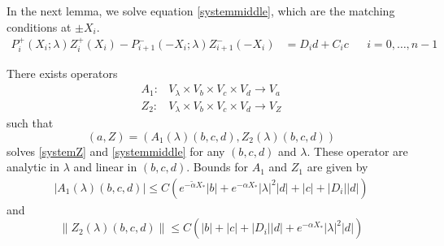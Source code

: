 \documentclass[thesis.tex]{subfiles}
\begin{document}
In the next lemma, we solve equation \eqref{systemmiddle}, which are the matching conditions at $\pm X_i$.
\begin{align*}
P_i^+(X_i; \lambda) Z_i^+(X_i) - P_{i+1}^-(-X_i; \lambda) Z_{i+1}^-(-X_i) &= D_i d + C_i c && i = 0, \dots, n-1
\end{align*}

\begin{lemma}\label{Zinv1}
There exists operators
\begin{align*}
A_1: &V_\lambda \times V_b \times V_c \times V_d \rightarrow V_a \\
Z_2: &V_\lambda \times V_b \times V_c \times V_d \rightarrow V_Z
\end{align*}
such that 
\[
(a, Z) = (A_1(\lambda)(b, c, d), Z_2(\lambda)(b,c,d))
\]
solves \eqref{systemZ} and \eqref{systemmiddle} for any $(b, c, d)$ and $\lambda$. These operator are analytic in $\lambda$ and linear in $(b, c, d)$. Bounds for $A_1$ and $Z_1$ are given by
\begin{align}\label{A1bound}
|A_1(\lambda)(b, c, d)| \leq C \left( e^{-\tilde{\alpha} X_*} |b|  + e^{-\alpha X_*}|\lambda|^2 |d| + |c| + |D_i||d| \right)
\end{align} 
and
\begin{equation}\label{Z2bound}
\| Z_2(\lambda)(b,c,d) \| \leq C\left(|b| + |c| + |D_i||d| + e^{-\alpha X_*}|\lambda|^2|d|\right)
\end{equation}


\end{lemma}
\end{document}
